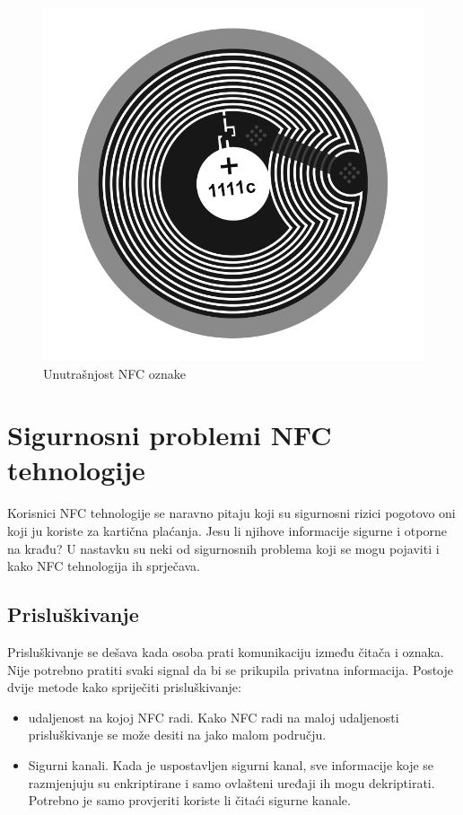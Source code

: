 \documentclass[times, utf8, zavrsni]{fer}
\begin{document}
\begin{figure}[h]
\includegraphics[scale=0.2]{nfctag.png}
\centering
\caption{Unutrašnjost NFC oznake \citep{5}}
\centering
\end{figure}

\section{Sigurnosni problemi NFC tehnologije}
Korisnici NFC tehnologije se naravno pitaju koji su sigurnosni rizici pogotovo oni koji ju koriste za kartična plaćanja. Jesu li njihove informacije sigurne i otporne na krađu? U nastavku su neki od sigurnosnih problema koji se mogu pojaviti i kako NFC tehnologija ih sprječava.
\subsection{Prisluškivanje}
Prisluškivanje se dešava kada osoba prati komunikaciju između čitača i oznaka. Nije potrebno pratiti svaki signal da bi se prikupila privatna informacija. Postoje dvije metode kako spriječiti prisluškivanje:
\begin{itemize}
\item udaljenost na kojoj NFC radi. Kako NFC radi na maloj udaljenosti prisluškivanje se može desiti na jako malom području.
\item Sigurni kanali. Kada je uspostavljen sigurni kanal, sve informacije koje se razmjenjuju su enkriptirane i samo ovlašteni uređaji ih mogu dekriptirati. Potrebno je samo provjeriti koriste li čitaći sigurne kanale.
\end{itemize}
\end{document}
